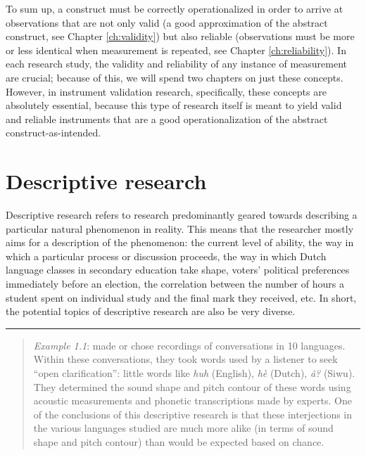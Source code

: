 \documentclass[
]{book}
\begin{document}
To sum up, a construct must be correctly operationalized in order to arrive at observations that are not only valid (a good approximation of the abstract construct, see Chapter \ref{ch:validity}) but also reliable (observations must be more or less identical when measurement is repeated, see Chapter \ref{ch:reliability}). In each research study, the validity and reliability of any instance of measurement are crucial; because of this, we will spend two chapters on just these concepts. However, in instrument validation research, specifically, these concepts are absolutely essential, because this type of research itself is meant to yield valid and reliable instruments that are a good operationalization of the abstract construct-as-intended.

\hypertarget{sec:descriptive-research}{%
\section{Descriptive research}\label{sec:descriptive-research}}

Descriptive research refers to research predominantly geared towards describing a particular natural phenomenon in reality. This means that the researcher mostly aims for a description of the phenomenon: the current level of ability, the way in which a particular process or discussion proceeds, the way in which Dutch language classes in secondary education take shape, voters' political preferences immediately before an election, the correlation between the number of hours a student spent on individual study and the final mark they received, etc. In short, the potential topics of descriptive research are also be very diverse.

\begin{center}\rule{0.5\linewidth}{0.5pt}\end{center}

\begin{quote}
\emph{Example 1.1}: \citet{DTE13} made or chose recordings of conversations in 10 languages. Within these conversations, they took words used by a listener to seek ``open clarification'': little words like \emph{huh} (English), \emph{hè} (Dutch), \emph{ã?} (Siwu). They determined the sound shape and pitch contour of these words using acoustic measurements and phonetic transcriptions made by experts. One of the conclusions of this descriptive research is that these interjections in the various languages studied are much more alike (in terms of sound shape and pitch contour) than would be expected based on chance.
\end{quote}
\end{document}
